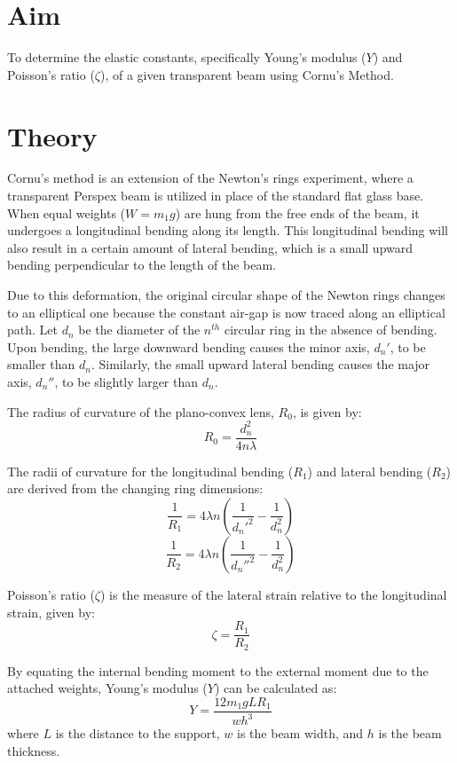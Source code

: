 \documentclass[../main.tex]{subfiles}
\begin{document}
\setcounter{page}{27}

\vspace*{1cm}
\section{Aim}
To determine the elastic constants, specifically Young's modulus ($Y$) and Poisson's ratio ($\zeta$), of a given transparent beam using Cornu's Method.

\section{Theory}
Cornu's method is an extension of the Newton's rings experiment, where a transparent Perspex beam is utilized in place of the standard flat glass base. When equal weights ($W = m_1g$) are hung from the free ends of the beam, it undergoes a longitudinal bending along its length. This longitudinal bending will also result in a certain amount of lateral bending, which is a small upward bending perpendicular to the length of the beam. 

Due to this deformation, the original circular shape of the Newton rings changes to an elliptical one because the constant air-gap is now traced along an elliptical path. Let $d_n$ be the diameter of the $n^{th}$ circular ring in the absence of bending. Upon bending, the large downward bending causes the minor axis, $d_n'$, to be smaller than $d_n$. Similarly, the small upward lateral bending causes the major axis, $d_n''$, to be slightly larger than $d_n$.

The radius of curvature of the plano-convex lens, $R_0$, is given by:
$$R_0 = \frac{d_n^2}{4n\lambda}$$

The radii of curvature for the longitudinal bending ($R_1$) and lateral bending ($R_2$) are derived from the changing ring dimensions:
$$\frac{1}{R_1} = 4\lambda n \left( \frac{1}{d_n'^2} - \frac{1}{d_n^2} \right)$$
$$\frac{1}{R_2} = 4\lambda n \left( \frac{1}{d_n''^2} - \frac{1}{d_n^2} \right)$$

Poisson's ratio ($\zeta$) is the measure of the lateral strain relative to the longitudinal strain, given by:
$$\zeta = \frac{R_1}{R_2}$$

By equating the internal bending moment to the external moment due to the attached weights, Young's modulus ($Y$) can be calculated as:
$$Y = \frac{12 m_1g L R_1}{w h^3}$$
where $L$ is the distance to the support, $w$ is the beam width, and $h$ is the beam thickness.
\end{document}
